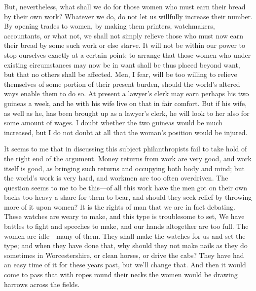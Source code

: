 But, nevertheless, what shall we do for those women who must earn
their bread by their own work?  Whatever we do, do not let us
willfully increase their number.  By opening trades to women, by
making them printers, watchmakers, accountants, or what not, we
shall not simply relieve those who must now earn their bread by
some such work or else starve.  It will not be within our power to
stop ourselves exactly at a certain point; to arrange that those
women who under existing circumstances may now be in want shall be
thus placed beyond want, but that no others shall be affected.
Men, I fear, will be too willing to relieve themselves of some
portion of their present burden, should the world's altered ways
enable them to do so.  At present a lawyer's clerk may earn perhaps
his two guineas a week, and he with his wife live on that in fair
comfort.  But if his wife, as well as he, has been brought up as a
lawyer's clerk, he will look to her also for some amount of wages.
I doubt whether the two guineas would be much increased, but I do
not doubt at all that the woman's position would be injured.

It seems to me that in discussing this subject philanthropists fail
to take hold of the right end of the argument.  Money returns from
work are very good, and work itself is good, as bringing such
returns and occupying both body and mind; but the world's work is
very hard, and workmen are too often overdriven.  The question
seems to me to be this---of all this work have the men got on their
own backs too heavy a share for them to bear, and should they seek
relief by throwing more of it upon women?  It is the rights of man
that we are in fact debating.  These watches are weary to make, and
this type is troublesome to set, We have battles to fight and
speeches to make, and our hands altogether are too full.  The women
are idle---many of them.  They shall make the watches for us and set
the type; and when they have done that, why should they not make
nails as they do sometimes in Worcestershire, or clean horses, or
drive the cabs?  They have had an easy time of it for these years
past, but we'll change that.  And then it would come to pass that
with ropes round their necks the women would be drawing harrows
across the fields.

